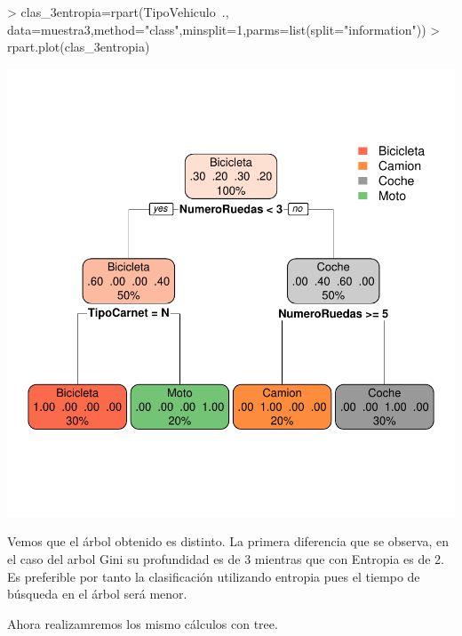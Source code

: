 \documentclass [a4paper] {article}
\begin{document}
\begin{center}
\begin{Schunk}
\begin{Sinput}
> clas_3entropia=rpart(TipoVehiculo~., data=muestra3,method="class",minsplit=1,parms=list(split="information"))
> rpart.plot(clas_3entropia)
\end{Sinput}
\end{Schunk}
\includegraphics{entrega2-rpart_gini}
\end{center}

Vemos que el árbol obtenido es distinto.
La primera diferencia que se observa, en el caso del arbol Gini su profundidad es de 3 mientras que con Entropia es de 2. 
Es preferible por tanto la clasificación utilizando entropia pues el tiempo de búsqueda en el árbol será menor.

Ahora realizamremos los mismo cálculos con tree.
\end{document}

